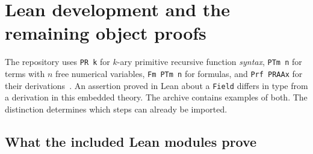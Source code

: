 \section{Lean development and the remaining object proofs}
\label{sec:lean}
The repository uses \texttt{PR k} for $k$-ary primitive recursive function
\emph{syntax}, \texttt{PTm n} for terms with $n$ free numerical variables,
\texttt{Fm PTm n} for formulas, and \texttt{Prf PRAAx} for their
derivations~\cite{proveit}. An assertion proved in Lean about a
\texttt{Field} differs in type from a derivation in this embedded theory.
The archive contains examples of both. The distinction determines which
steps can already be imported.

\subsection{What the included Lean modules prove}
